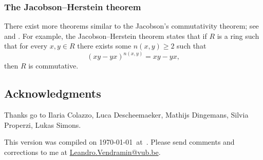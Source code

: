 \subsubsection*{The Jacobson--Herstein theorem}

There exist more theorems similar to 
the Jacobson's commutativity theorem; see \cite{MR1838439} and \cite{MR2319575}. For example, 
the Jacobson--Herstein theorem states that  
if $R$ is a ring
such that for every $x,y\in R$ there exists some
$n(x,y)\geq2$ such that 
\[
(xy-yx)^{n(x,y)}=xy-yx,
\]
then $R$ is commutative.

\subsection*{Acknowledgments}

Thanks go to Ilaria Colazzo, 
Luca Descheemaeker, 
Mathijs Dingemans, 
Silvia Properzi, Lukas Simons.   

\bigskip 
This version 
was compiled on \today~at~\currenttime.
Please send comments and corrections to me at \url{Leandro.Vendramin@vub.be}. 


